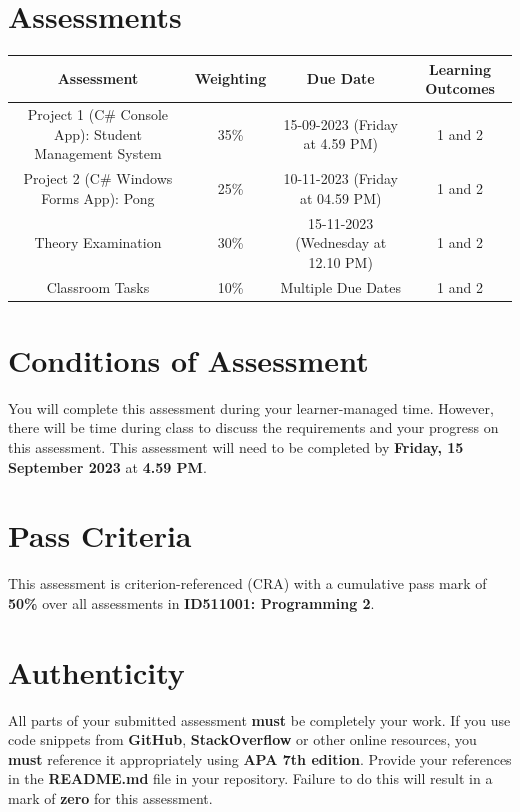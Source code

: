 \documentclass{article}
\begin{document}
\section*{Assessments}
\renewcommand{\arraystretch}{1.5}
\begin{tabular}{|c|c|c|c|}
	\hline
	\textbf{Assessment}                                 & \textbf{Weighting} & \textbf{Due Date}            & \textbf{Learning Outcomes} \\ \hline
	\small Project 1 (C\# Console App): Student Management System  & \small 35\%        & \small 15-09-2023 (Friday at 4.59 PM)   & \small 1 and 2                   \\ \hline
	\small Project 2 (C\# Windows Forms App): Pong & \small 25\%        & \small 10-11-2023 (Friday at 04.59 PM)  & \small 1 and 2                   \\ \hline
	\small Theory Examination                        & \small 30\%        & \small 15-11-2023 (Wednesday at 12.10 PM)  & \small 1 and 2                   \\ \hline
	\small Classroom Tasks                       & \small 10\%        & \small Multiple Due Dates  & \small 1 and 2                   \\ \hline
\end{tabular} 

\section*{Conditions of Assessment}
You will complete this assessment during your learner-managed time. However, there will be time during class to discuss the requirements and your progress on this assessment. This assessment will need to be completed by \textbf{Friday, 15 September 2023} at \textbf{4.59 PM}.

\section*{Pass Criteria}
This assessment is criterion-referenced (CRA) with a cumulative pass mark of \textbf{50\%} over all assessments in \textbf{ID511001: Programming 2}.

\section*{Authenticity}
All parts of your submitted assessment \textbf{must} be completely your work. If you use code snippets from \textbf{GitHub}, \textbf{StackOverflow} or other online resources, you \textbf{must} reference it appropriately using \textbf{APA 7th edition}. Provide your references in the \textbf{README.md} file in your repository. Failure to do this will result in a mark of \textbf{zero} for this assessment. 
\end{document}
